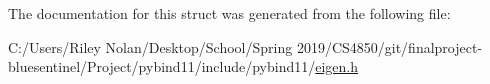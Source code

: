 The documentation for this struct was generated from the following file\+:\begin{DoxyCompactItemize}
\item 
C\+:/\+Users/\+Riley Nolan/\+Desktop/\+School/\+Spring 2019/\+C\+S4850/git/finalproject-\/bluesentinel/\+Project/pybind11/include/pybind11/\mbox{\hyperlink{eigen_8h}{eigen.\+h}}\end{DoxyCompactItemize}
